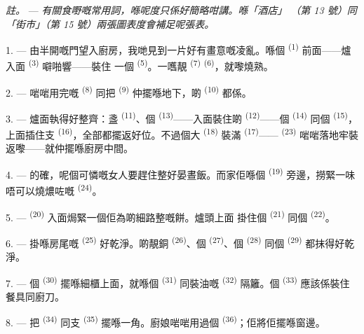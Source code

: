 \textit{註。} --- \textit{有關食嘢嘅常用詞，喺呢度只係好簡略咁講。喺「酒店」
（第 13 號）同「街市」（第 15 號）兩張圖表度會補足呢張表。}

\VUsaut{4.6mm}
\VUsaut{3.0mm}

1. --- 由半開嘅門望入廚房，我哋見到一片好有畫意嘅凌亂。喺個
\textsuperscript{(1)} 前面——爐入面 \textsuperscript{(3)} 噼啪響——裝住
一個 \textsuperscript{(5)}。一嚿靚 \textsuperscript{(7)}
 \textsuperscript{(6)}，就嚟燒熟。

2. --- 啱啱用完嘅 \textsuperscript{(8)} 同把 \textsuperscript{(9)}
仲擺喺地下，啲 \textsuperscript{(10)} 都係。

3. --- 爐面執得好整齊：盞 \textsuperscript{(11)}、個
\textsuperscript{(13)}——入面裝住啲 \textsuperscript{(12)}——個
 \textsuperscript{(14)} 同個 \textsuperscript{(15)}，
上面插住支 \textsuperscript{(16)}，全部都擺返好位。不過個大
 \textsuperscript{(18)} 裝滿 \textsuperscript{(17)}——
 \textsuperscript{(23)} 啱啱落地牢裝返嚟——就仲擺喺廚房中間。

4. --- 的確，呢個可憐嘅女人要趕住整好晏晝飯。而家佢喺個
\textsuperscript{(19)} 旁邊，撈緊一味唔可以燒燶咗嘅 \textsuperscript{(24)}。

5. ---  \textsuperscript{(20)} 入面焗緊一個佢為啲細路整嘅餅。爐頭上面
掛住個 \textsuperscript{(21)} 同個 \textsuperscript{(22)}。

\VUsaut{4.0mm}
\VUsaut{3.0mm}

6. --- 掛喺房尾嘅 \textsuperscript{(25)} 好乾淨。啲靚銅
\textsuperscript{(26)}、個 \textsuperscript{(27)}、個
\textsuperscript{(28)} 同個 \textsuperscript{(29)} 都抹得好乾淨。

7. --- 個 \textsuperscript{(30)} 擺喺細櫃上面，就喺個
\textsuperscript{(31)} 同裝油嘅 \textsuperscript{(32)} 隔籬。個
 \textsuperscript{(33)} 應該係裝住餐具同廚刀。

8. --- 把 \textsuperscript{(34)} 同支 \textsuperscript{(35)}
擺喺一角。廚娘啱啱用過個 \textsuperscript{(36)}；佢將佢擺喺窗邊。

